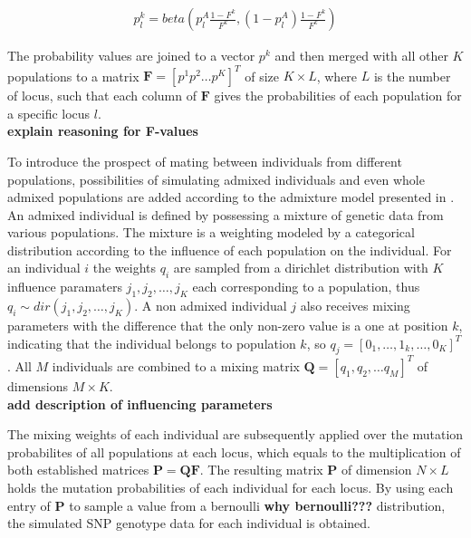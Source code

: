 \documentclass[a4paper, 11pt]{article}
\begin{document}
\begin{align*}
p^{k}_l = beta(p^{A}_{l} \frac{1 - F^k}{F^k}, (1-p^{A}_{l}) \frac{1 - F^k}{F^k})
\end{align*}

The probability values are joined to a vector $p^k$ and then merged with all other $K$ populations to a matrix $\mathbf{F} = [p^1 p^2 \ldots p^K]^T$ of size $K \times L$, where $L$ is the number of locus, such that each column of $\mathbf{F}$ gives the probabilities of each population for a specific locus $l$. \\

\textbf{explain reasoning for F-values}

To introduce the prospect of mating between individuals from different populations, possibilities of simulating admixed individuals and even whole admixed populations are added according to the admixture model presented in \cite{pritchard2000inference}. An admixed individual is defined by possessing a mixture of genetic data from various populations. The mixture is a weighting modeled by a categorical distribution according to the influence of each population on the individual. For an individual $i$ the weights $q_i$ are sampled from a dirichlet distribution with $K$ influence paramaters $j_1, j_2, \ldots, j_K$ each corresponding to a population, thus $q_i \sim dir(j_1, j_2, \ldots, j_K)$. A non admixed individual $j$ also receives mixing parameters with the difference that the only non-zero value is a one at position $k$, indicating that the individual belongs to population $k$, so $q_j = [0_1, \ldots, 1_k, \ldots, 0_K]^T$. All $M$ individuals are combined to a mixing matrix $\mathbf{Q} = [q_1,q_2, \ldots q_M]^T$ of dimensions $M \times K$. \\

\textbf{add description of influencing parameters}

The mixing weights of each individual are subsequently applied over the mutation probabilites of all populations at each locus, which equals to the multiplication of both established matrices $\mathbf{P} = \mathbf{Q}\mathbf{F}$. The resulting matrix $\mathbf{P}$ of dimension $N \times L$ holds the mutation probabilities of each individual for each locus. By using each entry of $\mathbf{P}$ to sample a value from a bernoulli \textbf{why bernoulli???} distribution, the simulated SNP genotype data for each individual is obtained. \\
\end{document}
